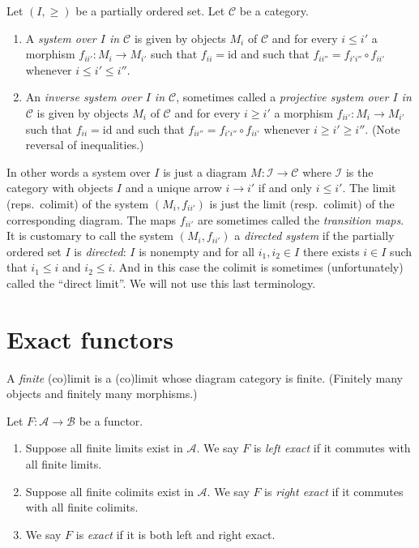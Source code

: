 \noindent
Let $(I, \geq)$ be a partially ordered set.
Let $\mathcal{C}$ be a category.

\begin{definition}
\label{definition-system-over-poset}
\begin{enumerate}
\item A {\it system over $I$ in $\mathcal{C}$} is given by 
objects $M_i$ of $\mathcal{C}$ and for every $i \leq i'$ a
morphism $f_{ii'} : M_i \to M_{i'}$ such that $f_{ii}
= \text{id}$ and such that $f_{ii''} = f_{i'i''} \circ f_{i i'}$
whenever $i \leq i' \leq i''$.
\item An {\it inverse system over $I$ in $\mathcal{C}$},
sometimes called a {\it projective system over $I$ in $\mathcal{C}$}
is given by objects $M_i$ of $\mathcal{C}$ and for every $i \geq i'$ a
morphism $f_{ii'} : M_i \to M_{i'}$ such that $f_{ii}
= \text{id}$ and such that $f_{ii''} = f_{i'i''} \circ f_{i i'}$
whenever $i \geq i' \geq i''$. (Note reversal of inequalities.)
\end{enumerate}
\end{definition}

\noindent
In other words a system over $I$ is just a diagram $M : \mathcal{I}
\to \mathcal{C}$ where $\mathcal{I}$ is the category with
objects $I$ and a unique arrow $i \to i'$ if and only
$i \leq i'$. The limit (reps.\ colimit) of the system
$(M_i, f_{ii'})$ is just the limit (resp.\ colimit)
of the corresponding diagram. The maps $f_{ii'}$ are sometimes
called the {\it transition maps}.
It is customary to call the system
$(M_i, f_{ii'})$ a {\it directed system} if the partially
ordered set $I$ is {\it directed}: $I$ is nonempty and
for all $i_1,i_2 \in I$ there exists $i\in I$ such that
$i_1 \leq i$ and $i_2 \leq i$.
And in this case the colimit is sometimes (unfortunately)
called the ``direct limit''. We will not use this last
terminology.

\section{Exact functors}
\label{section-exact-functor}

\noindent
A {\it finite} (co)limit is a (co)limit whose diagram category is finite.
(Finitely many objects and finitely many morphisms.)

\begin{definition}
\label{definition-exact}
Let $F : \mathcal{A} \to \mathcal{B}$ be a functor.
\begin{enumerate}
\item Suppose all finite limits exist in $\mathcal{A}$.
We say $F$ is {\it left exact} if it commutes
with all finite limits.
\item Suppose all finite colimits exist in $\mathcal{A}$.
We say $F$ is {\it right exact} if it commutes
with all finite colimits.
\item We say $F$ is {\it exact} if it is both left and right
exact.
\end{enumerate}
\end{definition}

